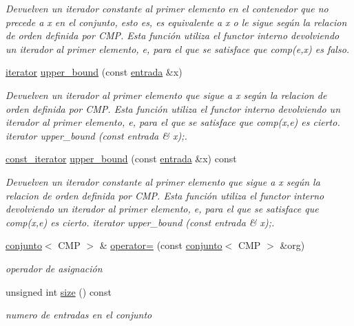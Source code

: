 \begin{DoxyCompactItemize}
\begin{DoxyCompactList}\small\item\em Devuelven un iterador constante al primer elemento en el contenedor que no precede a x en el conjunto, esto es, es equivalente a x o le sigue según la relacion de orden definida por C\-M\-P. Esta función utiliza el functor interno devolviendo un iterador al primer elemento, e, para el que se satisface que comp(e,x) es falso. \end{DoxyCompactList}\item 
\hyperlink{classconjunto_1_1iterator}{iterator} \hyperlink{classconjunto_a046fe0ebbba356060877015fd3cb373c}{upper\-\_\-bound} (const \hyperlink{classconjunto_a7630ace7cb17bcec07daf5804f1a0780}{entrada} \&x)
\begin{DoxyCompactList}\small\item\em Devuelven un iterador al primer elemento que sigue a x según la relacion de orden definida por C\-M\-P. Esta función utiliza el functor interno devolviendo un iterador al primer elemento, e, para el que se satisface que comp(x,e) es cierto. iterator upper\-\_\-bound (const entrada \& x);. \end{DoxyCompactList}\item 
\hyperlink{classconjunto_1_1const__iterator}{const\-\_\-iterator} \hyperlink{classconjunto_a4fa712ea853ef69a8a55a59da3b177fc}{upper\-\_\-bound} (const \hyperlink{classconjunto_a7630ace7cb17bcec07daf5804f1a0780}{entrada} \&x) const 
\begin{DoxyCompactList}\small\item\em Devuelven un iterador constante al primer elemento que sigue a x según la relacion de orden definida por C\-M\-P. Esta función utiliza el functor interno devolviendo un iterador al primer elemento, e, para el que se satisface que comp(x,e) es cierto. iterator upper\-\_\-bound (const entrada \& x);. \end{DoxyCompactList}\item 
\hyperlink{classconjunto}{conjunto}$<$ C\-M\-P $>$ \& \hyperlink{classconjunto_accd0bbeecfd69cd5fbce17cfe2b7d363}{operator=} (const \hyperlink{classconjunto}{conjunto}$<$ C\-M\-P $>$ \&org)
\begin{DoxyCompactList}\small\item\em operador de asignación \end{DoxyCompactList}\item 
unsigned int \hyperlink{classconjunto_aa2d78be0b9fd7aecf1fccf9ad502b907}{size} () const 
\begin{DoxyCompactList}\small\item\em numero de entradas en el conjunto \end{DoxyCompactList}\item 

\end{DoxyCompactItemize}

